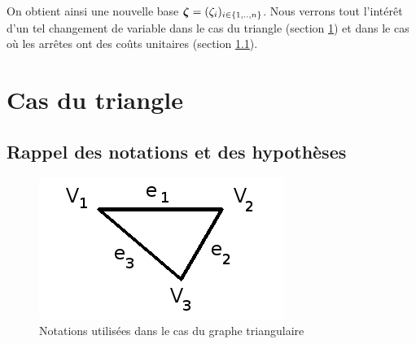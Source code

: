 \documentclass[twoside,11pt,openany,a4paper]{rapport}
\begin{document}
On obtient ainsi une nouvelle base $\boldsymbol{\zeta} = (\zeta_i)_{i \in \{1,..,n\}}$. Nous verrons tout l'intérêt d'un tel changement de variable dans le cas du triangle (section \ref{Cas du Triangle}) et dans le cas où les arrêtes ont des coûts unitaires (section \ref{}).

\chapter{Cas du triangle}
\label{Cas du Triangle}

\section{Rappel des notations et des hypothèses}

\begin{figure}[ht]
  \label{Notation graphe triangulaire}
  \center \includegraphics[scale=0.5]{graphe_triangulaire_notations.jpg}
  \caption{Notations utilisées dans le cas du graphe triangulaire}
\end{figure}
\end{document}
